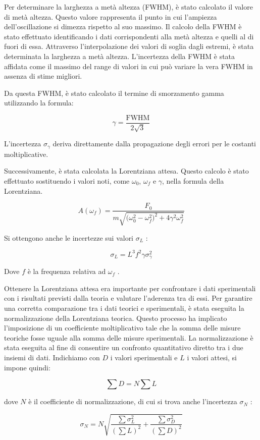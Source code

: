 \documentclass[12pt]{article}
\begin{document}
Per determinare la larghezza a metà altezza (FWHM), è stato calcolato il valore di metà altezza. Questo valore rappresenta il punto in cui l'ampiezza dell'oscillazione si dimezza rispetto al suo massimo. Il calcolo della FWHM è stato effettuato identificando i dati corrispondenti alla metà altezza e quelli al di fuori di essa. Attraverso l'interpolazione dei valori di soglia dagli estremi, è stata determinata la larghezza a metà altezza. L'incertezza della FWHM è stata affidata come il massimo del range di valori in cui può variare la vera FWHM in assenza di stime migliori.

Da questa FWHM, è stato calcolato il termine di smorzamento gamma utilizzando la formula:

\[ \gamma = \frac{\mathrm{{FWHM}}}{2\sqrt{3}} \]

L'incertezza $\sigma_\gamma$ deriva direttamente dalla propagazione degli errori per le costanti moltiplicative.

Successivamente, è stata calcolata la Lorentziana attesa. Questo calcolo è stato effettuato sostituendo i valori noti, come $\omega_0$, $\omega_f$ e $\gamma$, nella formula della Lorentziana. 

\[ A(\omega_f)=\frac{F_0}{m\sqrt{\bigg(\omega_0^2-\omega_f^2\bigg)^2+4\gamma^2\omega_f^2}} \]

Si ottengono anche le incertezze sui valori $\sigma_L$ :

\[ \sigma_{L}=L^3f^2\gamma\sigma_{\gamma}^2 \]

Dove $f$ è la frequenza relativa ad $\omega_f$ .

Ottenere la Lorentziana attesa era importante per confrontare i dati sperimentali con i risultati previsti dalla teoria e valutare l'aderenza tra di essi. Per garantire una corretta comparazione tra i dati teorici e sperimentali, è stata eseguita la normalizzazione della Lorentziana teorica. Questo processo ha implicato l'imposizione di un coefficiente moltiplicativo tale che la somma delle misure teoriche fosse uguale alla somma delle misure sperimentali. La normalizzazione è stata eseguita al fine di consentire un confronto quantitativo diretto tra i due insiemi di dati.
Indichiamo con $D$ i valori sperimentali e $L$ i valori attesi, si impone quindi:

\[ \sum D=N\sum L \]

dove $N$ è il coefficiente di normalizzazione, di cui si trova anche l'incertezza $\sigma_N$ :

\[ \sigma_N=N\sqrt{\frac{\sum \sigma_L^2}{(\sum L)^2}+\frac{\sum \sigma_D^2}{(\sum D)^2}} \]
\end{document}
